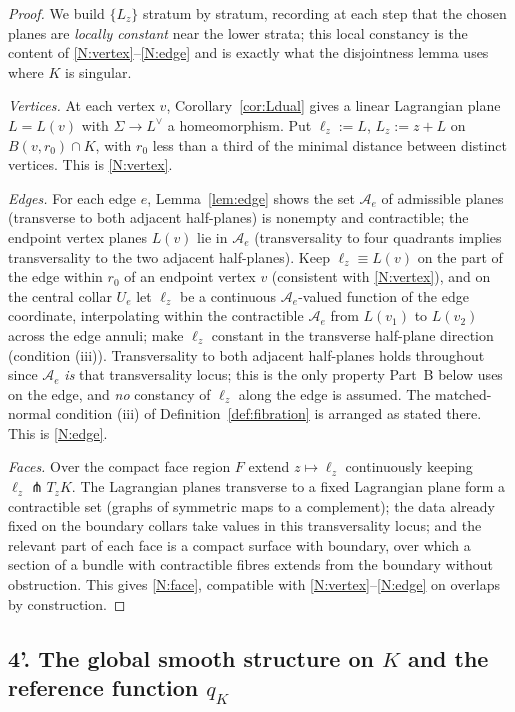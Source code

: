 \begin{proof}
We build $\{L_z\}$ stratum by stratum, recording at each step that the chosen planes
are \emph{locally constant} near the lower strata; this local constancy is the content
of \ref{N:vertex}--\ref{N:edge} and is exactly what the disjointness lemma uses where
$K$ is singular.

\emph{Vertices.} At each vertex $v$, Corollary~\ref{cor:Ldual} gives a linear
Lagrangian plane $L=L(v)$ with $\Sigma\to L^\vee$ a homeomorphism. Put $\ell_z:=L$,
$L_z:=z+L$ on $B(v,r_0)\cap K$, with $r_0$ less than a third of the minimal distance
between distinct vertices. This is \ref{N:vertex}.

\emph{Edges.} For each edge $e$, Lemma~\ref{lem:edge} shows the set $\mathcal A_e$ of
admissible planes (transverse to both adjacent half-planes) is nonempty and
contractible; the endpoint vertex planes $L(v)$ lie in $\mathcal A_e$ (transversality
to four quadrants implies transversality to the two adjacent half-planes). Keep
$\ell_z\equiv L(v)$ on the part of the edge within $r_0$ of an endpoint vertex $v$
(consistent with \ref{N:vertex}), and on the central collar $U_e$ let $\ell_z$ be a
continuous $\mathcal A_e$-valued function of the edge coordinate, interpolating within
the contractible $\mathcal A_e$ from $L(v_1)$ to $L(v_2)$ across the edge annuli;
make $\ell_z$ constant in the transverse half-plane direction (condition (iii)).
Transversality to both adjacent half-planes holds throughout since $\mathcal A_e$
\emph{is} that transversality locus; this is the only property Part~B below uses on
the edge, and \emph{no} constancy of $\ell_z$ along the edge is assumed. The
matched-normal condition (iii) of Definition~\ref{def:fibration} is arranged as stated
there. This is \ref{N:edge}.

\emph{Faces.} Over the compact face region $F$ extend $z\mapsto\ell_z$ continuously
keeping $\ell_z\pitchfork T_zK$. The Lagrangian planes transverse to a fixed
Lagrangian plane form a contractible set (graphs of symmetric maps to a complement);
the data already fixed on the boundary collars take values in this transversality
locus; and the relevant part of each face is a compact surface with boundary, over
which a section of a bundle with contractible fibres extends from the boundary without
obstruction. This gives \ref{N:face}, compatible with \ref{N:vertex}--\ref{N:edge} on
overlaps by construction.
\end{proof}


\subsection*{4'. The global smooth structure on $K$ and the reference function $q_K$}

